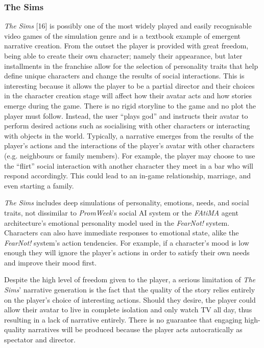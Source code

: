\documentclass{sig-alternate-05-2015}
\begin{document}
\subsubsection{The Sims}
\textit{The Sims} [16] is possibly one of the most widely played and easily recognisable video games of the simulation genre and is a textbook example of emergent narrative creation. 
From the outset the player is provided with great freedom, being able to create their own character; namely their appearance, but later installments in the franchise allow for the selection of personality traits that help define unique characters and change the results of social interactions. This is interesting because it allows the player to be a partial director and their choices in the character creation stage will affect how their avatar acts and how stories emerge during the game. There is no rigid storyline to the game and no plot the player must follow. Instead, the user ``plays god'' and instructs their avatar to perform desired actions such as socialising with other characters or interacting with objects in the world. Typically, a narrative emerges from the results of the player's actions and the interactions of the player's avatar with other characters (e.g. neighbours or family members). For example, the player may choose to use the ``flirt'' social interaction with another character they meet in a bar who will respond accordingly. This could lead to an in-game relationship, marriage, and even starting a family.

\textit{The Sims} includes deep simulations of personality, emotions, needs, and social traits, not dissimilar to \textit{PromWeek}'s social AI system or the \textit{FAtiMA} agent architecture's emotional personality model used in the \textit{FearNot!} system. Characters can also have immediate responses to emotional state, alike the \textit{FearNot!} system's action tendencies. For example, if a character's mood is low enough they will ignore the player's actions in order to satisfy their own needs and improve their mood first.

Despite the high level of freedom given to the player, a serious limitation of \textit{The Sims}' narrative generation is the fact that the quality of the story relies entirely on the player's choice of interesting actions. Should they desire, the player could allow their avatar to live in complete isolation and only watch TV all day, thus resulting in a lack of narrative entirely. There is no guarantee that engaging high-quality narratives will be produced because the player acts autocratically as spectator and director.
\end{document}
